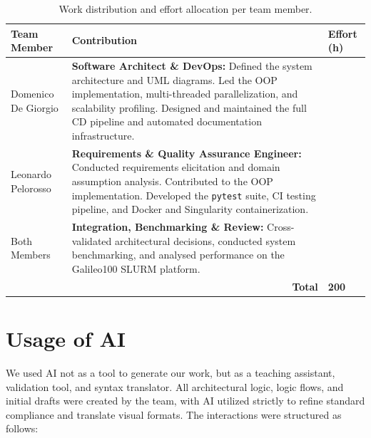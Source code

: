 \documentclass[11pt, a4paper]{article}
\begin{document}
\begin{table}[htbp]
    \centering
    \renewcommand{\arraystretch}{1.6}
    \begin{tabularx}{\textwidth}{@{} >{\raggedright\arraybackslash}p{4cm} X >{\centering\arraybackslash}p{2.5cm} @{}}
                \toprule
        \textbf{Team Member} & \textbf{Contribution} & \textbf{Effort (h)} \\
        \midrule
        Domenico De Giorgio &
        \textbf{Software Architect \& DevOps:}
        Defined the system architecture and UML diagrams. Led the OOP implementation,
        multi-threaded parallelization, and scalability profiling. Designed and
        maintained the full CD pipeline and automated documentation infrastructure. & 90 \\
        \midrule
        Leonardo Pelorosso &
        \textbf{Requirements \& Quality Assurance Engineer:}
        Conducted requirements elicitation and domain assumption analysis. Contributed
        to the OOP implementation. Developed the \texttt{pytest} suite, CI testing
        pipeline, and Docker and Singularity containerization. & 90 \\
        \midrule
        Both Members &
        \textbf{Integration, Benchmarking \& Review:}
        Cross-validated architectural decisions, conducted system benchmarking,
        and analysed performance on the Galileo100 SLURM platform. & 20 \\
        \midrule
        & \multicolumn{1}{r}{\textbf{Total}} & \textbf{200} \\
        \bottomrule
    \end{tabularx}
    \caption{Work distribution and effort allocation per team member.}
    \label{tab:work_distribution}
\end{table}

\newpage

\section{Usage of AI}
We used AI not as a tool to generate our work, but as a teaching assistant, validation tool,
and syntax translator. All architectural logic, logic flows, and initial drafts were created by the
team, with AI utilized strictly to refine standard compliance and translate visual formats. The
interactions were structured as follows:

\vspace{0.5cm}
\end{document}
